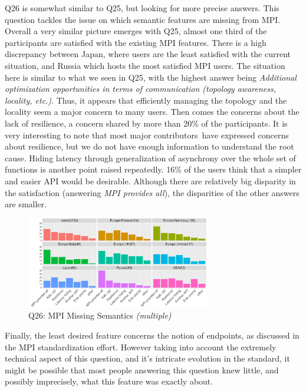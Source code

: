 \documentclass[preprint,5p,times]{elsarticle}
\def\myquote#1{{\it #1}}
\def\mcountries{major contributors\xspace{}}%
\begin{document}
Q26 is somewhat similar to Q25, but looking for more precise answers. This
question tackles the issue on which semantic features are missing from MPI.
Overall a very similar picture emerges with Q25, almost one third of the
participants are satisfied with the existing MPI features. There is a high
discrepancy between Japan, where users are the least satisfied with the current
situation, and Russia which hosts the most satisfied MPI users.
%
The situation here is similar to what we seen in Q25, with the highest answer
being \myquote{Additional optimization opportunities in terms of communication
(topology awareness, locality, etc.)}. Thus, it appears that efficiently
managing the topology and the locality seem a major concern to many users. Then
comes the concerns about the lack of resilience, a concern shared by more than
20\% of the participants. It is very interesting to note that most \mcountries\
have expressed concerns about resilience, but we do not have enough information
to understand the root cause. Hiding latency through generalization of
asynchrony over the whole set of functions is another point raised repeatedly.
16\% of the users think that a simpler and easier API would be desirable.
Although there are relatively big disparity in the satisfaction (answering
\myquote{MPI provides all}), the disparities of the other answers are smaller.

\begin{figure}[htb]
\begin{center}
\includegraphics[width=8.0cm]{R-scripts/Q26.pdf}
\vspace{-2mm}
\caption{Q26: MPI Missing Semantics {\it(multiple)}}
\label{fig:missing-semantics}
\end{center}
\end{figure}

Finally, the least desired feature concerns the notion of endpoints, as
discussed in the MPI standardization effort. However taking into account the
extremely technical aspect of this question, and it's intricate evolution in the
standard, it might be possible that most people answering this question knew
little, and possibly imprecisely, what this feature was exactly about.
\end{document}
